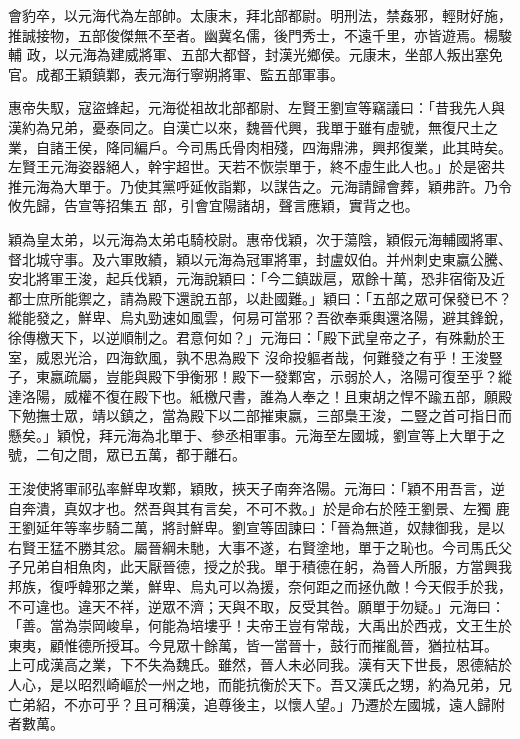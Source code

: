 \begin{pinyinscope}
 會豹卒，以元海代為左部帥。太康末，拜北部都尉。明刑法，禁姦邪，輕財好施，推誠接物，五部俊傑無不至者。幽冀名儒，後門秀士，不遠千里，亦皆遊焉。楊駿輔
 政，以元海為建威將軍、五部大都督，封漢光鄉侯。元康末，坐部人叛出塞免官。成都王穎鎮鄴，表元海行寧朔將軍、監五部軍事。



 惠帝失馭，寇盜蜂起，元海從祖故北部都尉、左賢王劉宣等竊議曰：「昔我先人與漢約為兄弟，憂泰同之。自漢亡以來，魏晉代興，我單于雖有虛號，無復尺土之業，自諸王侯，降同編戶。今司馬氏骨肉相殘，四海鼎沸，興邦復業，此其時矣。左賢王元海姿器絕人，幹宇超世。天若不恢崇單于，終不虛生此人也。」於是密共推元海為大單于。乃使其黨呼延攸詣鄴，以謀告之。元海請歸會葬，穎弗許。乃令攸先歸，告宣等招集五
 部，引會宜陽諸胡，聲言應穎，實背之也。



 穎為皇太弟，以元海為太弟屯騎校尉。惠帝伐穎，次于蕩陰，穎假元海輔國將軍、督北城守事。及六軍敗績，穎以元海為冠軍將軍，封盧奴伯。并州刺史東嬴公騰、安北將軍王浚，起兵伐穎，元海說穎曰：「今二鎮跋扈，眾餘十萬，恐非宿衛及近都士庶所能禦之，請為殿下還說五部，以赴國難。」穎曰：「五部之眾可保發已不？縱能發之，鮮卑、烏丸勁速如風雲，何易可當邪？吾欲奉乘輿還洛陽，避其鋒銳，徐傳檄天下，以逆順制之。君意何如？」元海曰：「殿下武皇帝之子，有殊勳於王室，威恩光洽，四海欽風，孰不思為殿下
 沒命投軀者哉，何難發之有乎！王浚豎子，東嬴疏屬，豈能與殿下爭衡邪！殿下一發鄴宮，示弱於人，洛陽可復至乎？縱達洛陽，威權不復在殿下也。紙檄尺書，誰為人奉之！且東胡之悍不踰五部，願殿下勉撫士眾，靖以鎮之，當為殿下以二部摧東嬴，三部梟王浚，二豎之首可指日而懸矣。」穎悅，拜元海為北單于、參丞相軍事。元海至左國城，劉宣等上大單于之號，二旬之間，眾已五萬，都于離石。



 王浚使將軍祁弘率鮮卑攻鄴，穎敗，挾天子南奔洛陽。元海曰：「穎不用吾言，逆自奔潰，真奴才也。然吾與其有言矣，不可不救。」於是命右於陸王劉景、左獨
 鹿王劉延年等率步騎二萬，將討鮮卑。劉宣等固諫曰：「晉為無道，奴隸御我，是以右賢王猛不勝其忿。屬晉綱未馳，大事不遂，右賢塗地，單于之恥也。今司馬氏父子兄弟自相魚肉，此天厭晉德，授之於我。單于積德在躬，為晉人所服，方當興我邦族，復呼韓邪之業，鮮卑、烏丸可以為援，奈何距之而拯仇敵！今天假手於我，不可違也。違天不祥，逆眾不濟；天與不取，反受其咎。願單于勿疑。」元海曰：「善。當為崇岡峻阜，何能為培塿乎！夫帝王豈有常哉，大禹出於西戎，文王生於東夷，顧惟德所授耳。今見眾十餘萬，皆一當晉十，鼓行而摧亂晉，猶拉枯耳。
 上可成漢高之業，下不失為魏氏。雖然，晉人未必同我。漢有天下世長，恩德結於人心，是以昭烈崎嶇於一州之地，而能抗衡於天下。吾又漢氏之甥，約為兄弟，兄亡弟紹，不亦可乎？且可稱漢，追尊後主，以懷人望。」乃遷於左國城，遠人歸附者數萬。




\end{pinyinscope}
